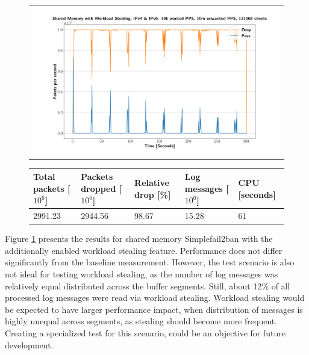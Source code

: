 \begin{figure}[!h]
	\centering
	\scriptsize
	\begin{tabular}{c}
    	\centerline{\includegraphics[width=1.2\textwidth]{images/simplefail2ban_shm_ws_ipv46_v10k_iv10m_c131068.png}}
	\end{tabular}
	\begin{tabular}{lllll}
		\toprule
		\textbf{Total packets [$10^6$]} & \textbf{Packets dropped [$10^6$]} & \textbf{Relative drop [\%]} & \textbf{Log messages [$10^6$]} & \textbf{CPU [seconds]} \\ \midrule 
		2991.23 & 2944.56 & 98.67 & 15.28 & 61 \\
		\bottomrule
	\end{tabular}
	\caption[Simplefail2ban, Shared Memory with Workload Sharing]{}
	\label{fig:simplefail2ban:shm:ws}
\end{figure}

Figure \ref{fig:simplefail2ban:shm:ws} presents the results for shared memory Simplefail2ban with the additionally enabled workload stealing feature. Performance does not differ significantly from the baseline measurement. However,
the test scenario is also not ideal for testing workload stealing, as the number of log messages was relatively equal distributed across the buffer segments. Still, about 12\% of all processed log messages were
read via workload stealing. Workload stealing would be expected to have 
larger performance impact, when distribution of messages is highly unequal across segments, as stealing should become more frequent. Creating a specialized test for this scenario, could be an objective for future development. 

\pagebreak

